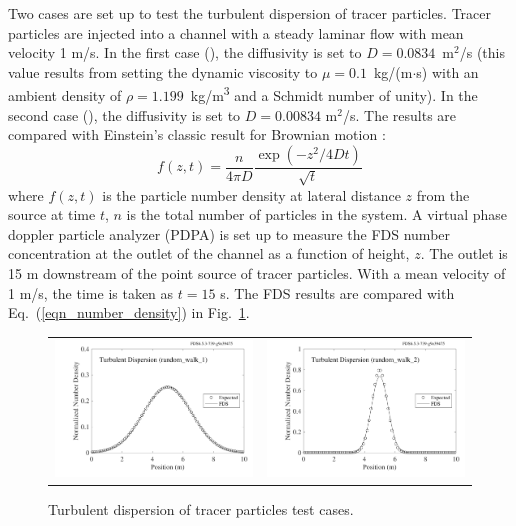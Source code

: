 \documentclass[11pt]{book}
\begin{document}
Two cases are set up to test the turbulent dispersion of tracer particles.  Tracer particles are injected into a channel with a steady laminar flow with mean velocity 1 m/s.  In the first case (), the diffusivity is set to $D=0.0834$~m$^2$/s (this value results from setting the dynamic viscosity to $\mu = 0.1$~kg/(m$\cdot$s) with an ambient density of $\rho=1.199$~\si{kg/m^3} and a Schmidt number of unity).  In the second case (), the diffusivity is set to $D=0.00834$ m$^2$/s.  The results are compared with Einstein's classic result for Brownian motion \cite{Gardiner:2004}:
\begin{equation}
\label{eqn_number_density}
f(z,t) = \frac{n}{4\pi D} \frac{\exp \left( -z^2/4Dt \right)}{\sqrt{t}}
\end{equation}
where $f(z,t)$ is the particle number density at lateral distance $z$ from the source at time $t$, $n$ is the total number of particles in the system.  A virtual phase doppler particle analyzer (PDPA) is set up to measure the FDS number concentration at the outlet of the channel as a function of height, $z$.  The outlet is 15 m downstream of the point source of tracer particles.  With a mean velocity of 1 m/s, the time is taken as $t = 15$ s.  The FDS results are compared with Eq.~(\ref{eqn_number_density}) in Fig.~\ref{random_walk}.

\begin{figure}[ht]
\begin{tabular*}{\textwidth}{lr}
\includegraphics[width=3.2in]{SCRIPT_FIGURES/random_walk_1} &
\includegraphics[width=3.2in]{SCRIPT_FIGURES/random_walk_2}
\end{tabular*}
\caption[Turbulent dispersion of tracer particles]{Turbulent dispersion of tracer particles  test cases.}
\label{random_walk}
\end{figure}
\end{document}
